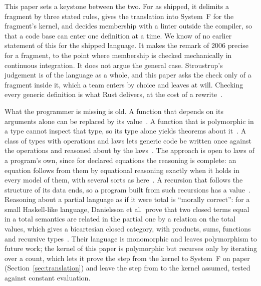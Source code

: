 This paper sets a keystone between the two.
For  as shipped, it delimits a fragment by three stated rules, gives the translation into System~F for the fragment's kernel, and decides membership with a linter outside the compiler, so that a code base can enter one definition at a time.
We know of no earlier statement of this for the shipped language.
It makes the remark of 2006 precise for a fragment, to the point where membership is checked mechanically in continuous integration.
It does not argue the general case.
Stroustrup's judgement is of the language as a whole, and this paper asks the check only of a fragment inside it, which a team enters by choice and leaves at will.
Checking every generic definition is what Rust delivers, at the cost of a rewrite~\cite{klabnik2023rust}.

What the programmer is missing is old.
A function that depends on its arguments alone can be replaced by its value~\cite{backus1978can}.
A function that is polymorphic in a type cannot inspect that type, so its type alone yields theorems about it~\cite{wadler1989theorems}.
A class of types with operations and laws lets generic code be written once against the operations and reasoned about by the laws~\cite{wadler1989adhoc}.
The approach is open to laws of a program's own, since for declared equations the reasoning is complete: an equation follows from them by equational reasoning exactly when it holds in every model of them, with several sorts as here~\cite{birkhoff1935structure,goguen1985completeness,burris1981universalalgebra}.
A recursion that follows the structure of its data ends, so a program built from such recursions has a value~\cite{turner2004total}.
Reasoning about a partial language as if it were total is ``morally correct'': for a small Haskell-like language, Danielsson et al.\ prove that two closed terms equal in a total semantics are related in the partial one by a relation on the total values, which gives a bicartesian closed category, with products, sums, functions and recursive types~\cite{danielsson2006fast}.
Their language is monomorphic and leaves polymorphism to future work; the kernel of this paper is polymorphic but recurses only by iterating over a count, which lets it prove the step from the kernel to System~F on paper (Section~\ref{sec:translation}) and leave the step from \Cpp{} to the kernel assumed, tested against constant evaluation.

